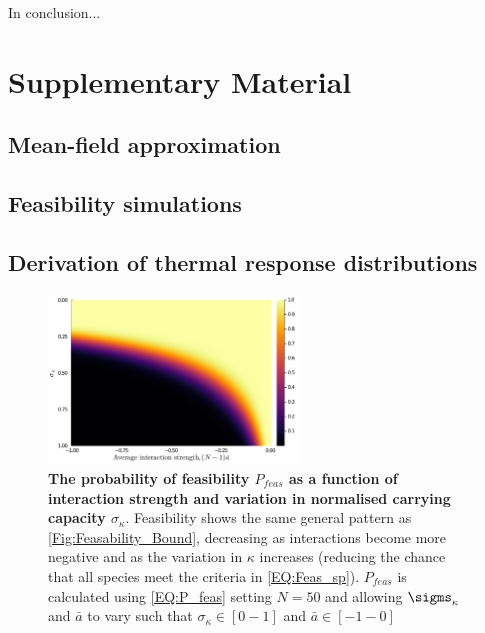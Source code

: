 \documentclass{article}
\begin{document}
In conclusion...





\newpage
\section{Supplementary Material}

\subsection{Mean-field approximation} \label{SI_Sec:Meanfield}

\subsection{Feasibility simulations} \label{SI_Sec:Feas_sims}

\subsection{Derivation of thermal response distributions} \label{SI_Sec:TPC_dist}

\begin{figure}
    \centering
    \includegraphics[width = 0.6\textwidth]{docs/Figures/Fig_2.pdf}
    \caption{\textbf{The probability of feasibility $P_{feas}$ as a function of interaction strength and variation in normalised carrying capacity $\sigma_{\kappa}$}. Feasibility shows the same general pattern as \cref{Fig:Feasability_Bound}, decreasing as interactions become more negative and as the variation in $\kappa$ increases (reducing the chance that all species meet the criteria in \cref{EQ:Feas_sp}). $P_{feas}$ is calculated using \cref{EQ:P_feas} setting $N=50$ and allowing $\sigms_{\kappa}$ and $\bar{a}$ to vary such that $\sigma_{\kappa} \in [0 - 1]$ and $\bar{a} \in [-1 - 0]$}
    \label{Fig:P_feas}
\end{figure}
\end{document}
